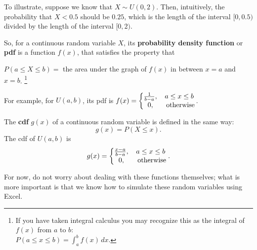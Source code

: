 To illustrate, suppose we know that $X \sim U(0,2)$.
Then, intuitively, the probability that $X < 0.5$ should be $0.25$, which is the length of the interval $[0,0.5)$ divided by the length of the interval $[0,2)$.

So, for a continuous random variable $X$, its \textbf{probability density function} or \textbf{pdf} is a function $f(x)$, that satisfies the property that 
\begin{center}$P(a \leq X \leq b) = $ the area under the graph of $f(x)$ in between $x = a$ and $x = b$. \footnote{If you have taken integral calculus you may recognize this as the integral of $f(x)$ from $a$ to $b$: \\ $ P(a \leq x \leq b) = \int_a^b f(x) \, dx .$}\end{center}

\vspace{-0.3cm}
For example, for $U(a,b)$, its pdf is $f(x) = \left\{ \begin{matrix} \frac{1}{b-a}, & a \leq x \leq b \cr 0, & \text{ otherwise}\end{matrix} \right.$.

The \textbf{cdf} $g(x)$ of a continuous random variable is defined in the same way: \[ g(x) = P(X \leq x).\]
The cdf of $U(a,b)$ is \[ g(x) = \left\{ \begin{matrix} \frac{x-a}{b-a}, & a \leq x \leq b \cr 0, & \text{ otherwise} \end{matrix} \right. . \]

For now, do not worry about dealing with these functions themselves; what is more important is that we know how to simulate these random variables using Excel.

